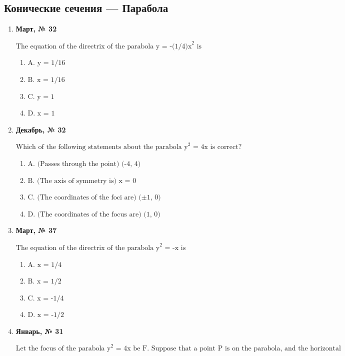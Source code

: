 \subsection*{Конические сечения — Парабола}
\begin{enumerate}
\item \textbf{Март, № 32} \par \smallskip
$\displaystyle \text{The equation of the directrix of the parabola y = -(1/4)x}^{2}\text{ is}$
\begin{enumerate}
\item $\displaystyle \text{A. y = 1/16}$
\item $\displaystyle \text{B. x = 1/16}$
\item $\displaystyle \text{C. y = 1}$
\item $\displaystyle \text{D. x = 1}$
\end{enumerate}
\item \textbf{Декабрь, № 32} \par \smallskip
$\displaystyle \text{Which of the following statements about the parabola y}^{2}\text{ = 4x is correct?}$
\begin{enumerate}
\item $\displaystyle \text{A.  (Passes through the point)   (-4, 4)}$
\item $\displaystyle \text{B.  (The axis of symmetry is) x = 0}$
\item $\displaystyle \text{C.  (The coordinates of the foci are)  (±1, 0)}$
\item $\displaystyle \text{D.  (The coordinates of the focus are)  (1, 0)}$
\end{enumerate}
\item \textbf{Март, № 37} \par \smallskip
$\displaystyle \text{The equation of the directrix of the parabola y}^{2}\text{ = -x is}$
\begin{enumerate}
\item $\displaystyle \text{A. x = 1/4}$
\item $\displaystyle \text{B. x = 1/2}$
\item $\displaystyle \text{C. x = -1/4}$
\item $\displaystyle \text{D. x = -1/2}$
\end{enumerate}
\item \textbf{Январь, № 31} \par \smallskip
$\displaystyle \text{Let the focus of the parabola y}^{2}\text{ = 4x be F. Suppose that a point P is on the parabola, and the horizontal coordinate of P is 4. Then |PF| = ( ).}$

\end{enumerate}
